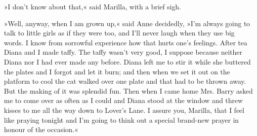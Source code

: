 »I don't know about that,« said Marilla, with a brief sigh.

»Well, anyway, when I am grown up,« said Anne decidedly, »I'm always going to talk to little girls as if they were too, and I'll never laugh when they use big words. I know from sorrowful experience how that hurts one's feelings. After tea Diana and I made taffy. The taffy wasn't very good, I suppose because neither Diana nor I had ever made any before. Diana left me to stir it while she buttered the plates and I forgot and let it burn; and then when we set it out on the platform to cool the cat walked over one plate and that had to be thrown away. But the making of it was splendid fun. Then when I came home Mrs. Barry asked me to come over as often as I could and Diana stood at the window and threw kisses to me all the way down to Lover's Lane. I assure you, Marilla, that I feel like praying tonight and I'm going to think out a special brand-new prayer in honour of the occasion.«